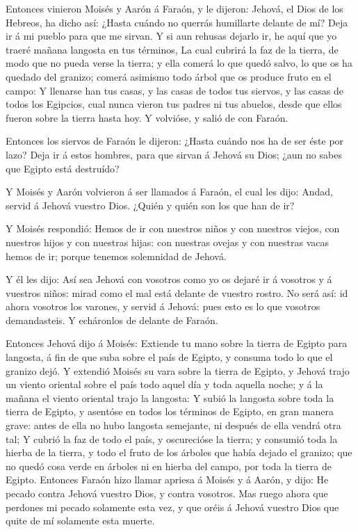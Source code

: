  Entonces vinieron Moisés y Aarón á Faraón, y le dijeron:
Jehová, el Dios de los Hebreos, ha dicho así: ¿Hasta cuándo no querrás
humillarte delante de mí? Deja ir á mi pueblo para que me sirvan.
 Y si aun rehusas dejarlo ir, he aquí que yo traeré mañana
langosta en tus términos,  La cual cubrirá la faz de la
tierra, de modo que no pueda verse la tierra; y ella comerá lo que quedó
salvo, lo que os ha quedado del granizo; comerá asimismo todo árbol que
os produce fruto en el campo:  Y llenarse han tus casas, y
las casas de todos tus siervos, y las casas de todos los Egipcios, cual
nunca vieron tus padres ni tus abuelos, desde que ellos fueron sobre la
tierra hasta hoy. Y volvióse, y salió de con Faraón.

 Entonces los siervos de Faraón le dijeron: ¿Hasta cuándo
nos ha de ser éste por lazo? Deja ir á estos hombres, para que sirvan á
Jehová su Dios; ¿aun no sabes que Egipto está destruído?

 Y Moisés y Aarón volvieron á ser llamados á Faraón, el cual
les dijo: Andad, servid á Jehová vuestro Dios. ¿Quién y quién son los
que han de ir?

 Y Moisés respondió: Hemos de ir con nuestros niños y con
nuestros viejos, con nuestros hijos y con nuestras hijas: con nuestras
ovejas y con nuestras vacas hemos de ir; porque tenemos solemnidad de
Jehová.

 Y él les dijo: Así sea Jehová con vosotros como yo os
dejaré ir á vosotros y á vuestros niños: mirad como el mal está delante
de vuestro rostro.  No será así: id ahora vosotros los
varones, y servid á Jehová: pues esto es lo que vosotros demandasteis. Y
echáronlos de delante de Faraón.

 Entonces Jehová dijo á Moisés: Extiende tu mano sobre la
tierra de Egipto para langosta, á fin de que suba sobre el país de
Egipto, y consuma todo lo que el granizo dejó.  Y extendió
Moisés su vara sobre la tierra de Egipto, y Jehová trajo un viento
oriental sobre el país todo aquel día y toda aquella noche; y á la
mañana el viento oriental trajo la langosta:  Y subió la
langosta sobre toda la tierra de Egipto, y asentóse en todos los
términos de Egipto, en gran manera grave: antes de ella no hubo langosta
semejante, ni después de ella vendrá otra tal;  Y cubrió la
faz de todo el país, y oscurecióse la tierra; y consumió toda la hierba
de la tierra, y todo el fruto de los árboles que había dejado el
granizo; que no quedó cosa verde en árboles ni en hierba del campo, por
toda la tierra de Egipto.  Entonces Faraón hizo llamar
apriesa á Moisés y á Aarón, y dijo: He pecado contra Jehová vuestro
Dios, y contra vosotros.  Mas ruego ahora que perdones mi
pecado solamente esta vez, y que oréis á Jehová vuestro Dios que quite
de mí solamente esta muerte.

